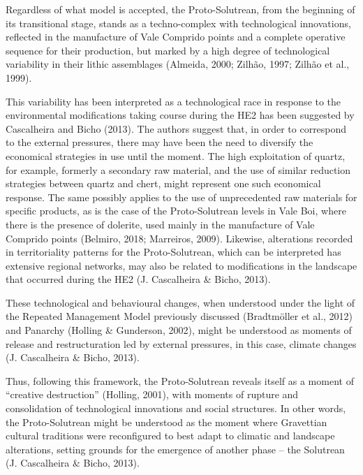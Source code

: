\documentclass[12pt,twoside]{reedthesis}
\begin{document}
Regardless of what model is accepted, the Proto-Solutrean, from the beginning of its transitional stage, stands as a techno-complex with technological innovations, reflected in the manufacture of Vale Comprido points and a complete operative sequence for their production, but marked by a high degree of technological variability in their lithic assemblages (Almeida, 2000; Zilhão, 1997; Zilhão et al., 1999).

This variability has been interpreted as a technological race in response to the environmental modifications taking course during the HE2 has been suggested by Cascalheira and Bicho (2013). The authors suggest that, in order to correspond to the external pressures, there may have been the need to diversify the economical strategies in use until the moment. The high exploitation of quartz, for example, formerly a secondary raw material, and the use of similar reduction strategies between quartz and chert, might represent one such economical response. The same possibly applies to the use of unprecedented raw materials for specific products, as is the case of the Proto-Solutrean levels in Vale Boi, where there is the presence of dolerite, used mainly in the manufacture of Vale Comprido points (Belmiro, 2018; Marreiros, 2009). Likewise, alterations recorded in territoriality patterns for the Proto-Solutrean, which can be interpreted has extensive regional networks, may also be related to modifications in the landscape that occurred during the HE2 (J. Cascalheira \& Bicho, 2013).

These technological and behavioural changes, when understood under the light of the Repeated Management Model previously discussed (Bradtmöller et al., 2012) and Panarchy (Holling \& Gunderson, 2002), might be understood as moments of release and restructuration led by external pressures, in this case, climate changes (J. Cascalheira \& Bicho, 2013).

Thus, following this framework, the Proto-Solutrean reveals itself as a moment of ``creative destruction'' (Holling, 2001), with moments of rupture and consolidation of technological innovations and social structures. In other words, the Proto-Solutrean might be understood as the moment where Gravettian cultural traditions were reconfigured to best adapt to climatic and landscape alterations, setting grounds for the emergence of another phase -- the Solutrean (J. Cascalheira \& Bicho, 2013).
\end{document}
